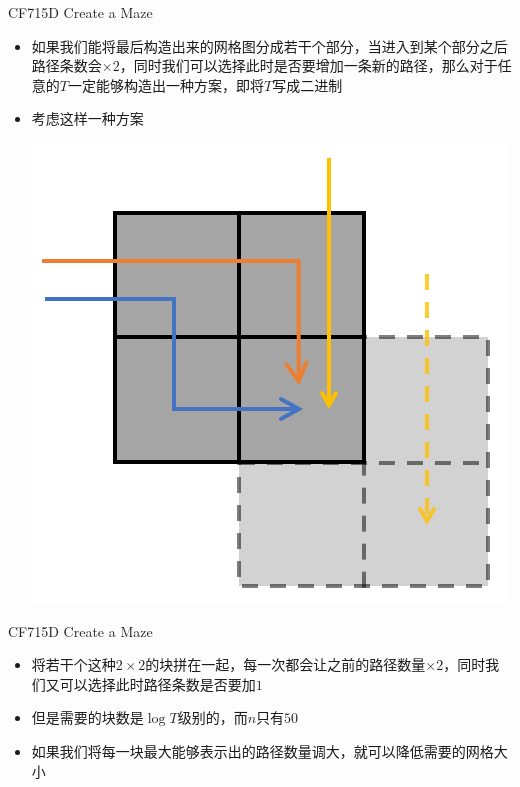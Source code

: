 \documentclass{beamer}
\begin{document}
\begin{frame}{CF715D Create a Maze}
    \begin{itemize}
        \item 如果我们能将最后构造出来的网格图分成若干个部分，当进入到某个部分之后路径条数会$\times 2$，同时我们可以选择此时是否要增加一条新的路径，那么对于任意的$T$一定能够构造出一种方案，即将$T$写成二进制
        \item 考虑这样一种方案\newline
        \begin{center}
            \includegraphics[scale = 0.5]{1.png}
        \end{center}
    \end{itemize}
\end{frame}

\begin{frame}{CF715D Create a Maze}
    \begin{itemize}
        \item 将若干个这种$2\times 2$的块拼在一起，每一次都会让之前的路径数量$\times 2$，同时我们又可以选择此时路径条数是否要加$1$
        \item 但是需要的块数是$\log T$级别的，而$n$只有$50$
        \item 如果我们将每一块最大能够表示出的路径数量调大，就可以降低需要的网格大小
    \end{itemize}
\end{frame}
\end{document}
